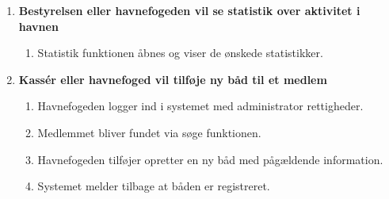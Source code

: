 \begin{enumerate}
    \item{\bf{Bestyrelsen eller havnefogeden vil se statistik over aktivitet i havnen}}
      \begin{enumerate}
        \item Statistik funktionen åbnes og viser de ønskede statistikker.
      \end{enumerate}
	  
	\item{\bf{Kassér eller havnefoged vil tilføje ny båd til et medlem}}
	  \begin{enumerate}
		\item Havnefogeden logger ind i systemet med administrator rettigheder.
		\item Medlemmet bliver fundet via søge funktionen.
		\item Havnefogeden tilføjer opretter en ny båd med pågældende information.
		\item Systemet melder tilbage at båden er registreret.
	   \end{enumerate}
\end{enumerate}
